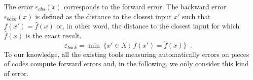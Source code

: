 \documentclass[main.tex]{subfiles}
\begin{document}
 
The error $\varepsilon_{abs}(x)$ corresponds to the forward error. The backward error $\varepsilon_{back}(x)$ is defined as the distance
to the closest input $x'$ such that $f(x')=\hat{f}(x)$ or, in other word, the distance to the closest input
for which $\hat{f}(x)$ is the exact result.
\begin{equation}
\varepsilon_{back} = \min\ \big\{ x'\in X\ :\ f(x')=\hat{f}(x)\big\}\enspace .
\end{equation}
To our knowledge, all the existing tools measuring automatically errors on pieces of codes compute forward errors and,
in the following, we only consider this kind of error.
\end{document}
